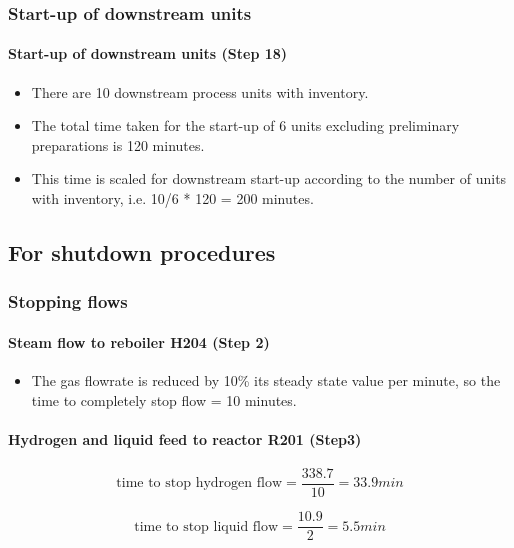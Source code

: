 \subsubsection{Start-up of downstream units }
\paragraph{Start-up of downstream units (Step 18)}
    \begin{itemize}
        \item There are 10 downstream process units with inventory.
        \item The total time taken for the start-up of 6 units excluding preliminary preparations is 120 minutes.
        \item This time is scaled for downstream start-up according to the number of units with inventory, i.e. 10/6 * 120 = 200 minutes.
    \end{itemize}

\subsection{For shutdown procedures}

\subsubsection{Stopping flows}
\paragraph{Steam flow to reboiler H204 (Step 2)}   
    \begin{itemize}
        \item The gas flowrate is reduced by 10\% its steady state value per minute, so the time to completely stop flow = 10 minutes.
    \end{itemize}
    
\paragraph{Hydrogen and liquid feed to reactor R201 (Step3)}
    \begin{equation}
        \text{time to stop hydrogen flow} = \frac{338.7}{10}=33.9 min
    \end{equation}
    
    \begin{equation}
        \text{time to stop liquid flow} = \frac{10.9}{2}=5.5 min
    \end{equation}
    
